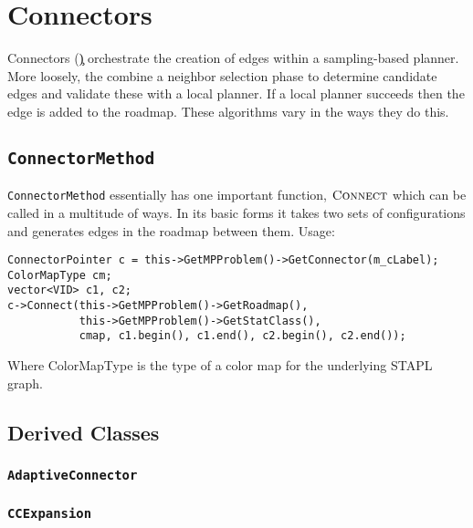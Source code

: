 \chapter{Connectors}

Connectors (\c) orchestrate the creation of edges within a sampling-based
planner. More loosely, the combine a neighbor selection phase to determine
candidate edges and validate these with a local planner. If a local planner
succeeds then the edge is added to the roadmap. These algorithms vary in the
ways they do this.

\section{\texttt{ConnectorMethod}}

\texttt{ConnectorMethod} essentially has one important function,
$\textsc{Connect}$ which can be called in a multitude of ways. In its basic forms
it takes two sets of configurations and generates edges in the roadmap between
them. Usage:
\begin{lstlisting}
ConnectorPointer c = this->GetMPProblem()->GetConnector(m_cLabel);
ColorMapType cm;
vector<VID> c1, c2;
c->Connect(this->GetMPProblem()->GetRoadmap(),
           this->GetMPProblem()->GetStatClass(),
           cmap, c1.begin(), c1.end(), c2.begin(), c2.end());
\end{lstlisting}
Where ColorMapType is the type of a color map for the underlying STAPL graph.

\section{Derived Classes}

\subsection{\texttt{AdaptiveConnector}}

\subsection{\texttt{CCExpansion}}

